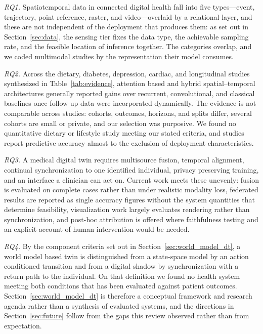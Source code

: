 \documentclass[journal]{IEEEtran}
\begin{document}
\emph{RQ1.} Spatiotemporal data in connected digital health fall into five types---event, trajectory, point reference, raster, and video---overlaid by a relational layer, and these are not independent of the deployment that produces them: as set out in Section~\ref{sec:data}, the sensing tier fixes the data type, the achievable sampling rate, and the feasible location of inference together. The categories overlap, and we coded multimodal studies by the representation their model consumes.

\emph{RQ2.} Across the dietary, diabetes, depression, cardiac, and longitudinal studies synthesized in Table~\ref{tab:evidence}, attention based and hybrid spatial--temporal architectures generally reported gains over recurrent, convolutional, and classical baselines once follow-up data were incorporated dynamically. The evidence is not comparable across studies: cohorts, outcomes, horizons, and splits differ, several cohorts are small or private, and our selection was purposive. We found no quantitative dietary or lifestyle study meeting our stated criteria, and studies report predictive accuracy almost to the exclusion of deployment characteristics.

\emph{RQ3.} A medical digital twin requires multisource fusion, temporal alignment, continual synchronization to one identified individual, privacy preserving training, and an interface a clinician can act on. Current work meets these unevenly: fusion is evaluated on complete cases rather than under realistic modality loss, federated results are reported as single accuracy figures without the system quantities that determine feasibility, visualization work largely evaluates rendering rather than synchronization, and post-hoc attribution is offered where faithfulness testing and an explicit account of human intervention would be needed.

\emph{RQ4.} By the component criteria set out in Section~\ref{sec:world_model_dt}, a world model based twin is distinguished from a state-space model by an action conditioned transition and from a digital shadow by synchronization with a return path to the individual. On that definition we found no health system meeting both conditions that has been evaluated against patient outcomes. Section~\ref{sec:world_model_dt} is therefore a conceptual framework and research agenda rather than a synthesis of evaluated systems, and the directions in Section~\ref{sec:future} follow from the gaps this review observed rather than from expectation.
\end{document}
